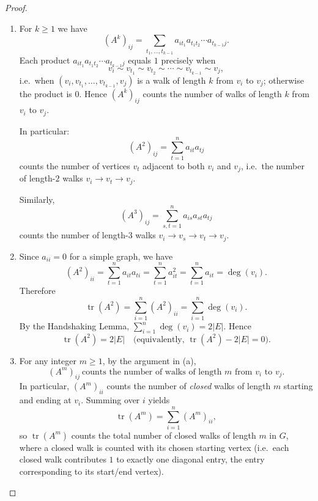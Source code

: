\documentclass[11pt, a4paper]{ctexrep}
\begin{document}
\begin{proof}
    \begin{enumerate}
        \item[(a)] For $k\ge 1$ we have
              \[
                  (A^k)_{ij}=\sum_{t_1,\dots,t_{k-1}} a_{i t_1}a_{t_1 t_2}\cdots a_{t_{k-1}j}.
              \]
              Each product $a_{i t_1}a_{t_1 t_2}\cdots a_{t_{k-1}j}$ equals $1$ precisely when
              \[
                  v_i\sim v_{t_1}\sim v_{t_2}\sim \cdots \sim v_{t_{k-1}}\sim v_j,
              \]
              i.e.\ when $(v_i,v_{t_1},\dots,v_{t_{k-1}},v_j)$ is a walk of length $k$ from $v_i$ to $v_j$; otherwise the product is $0$.
              Hence $(A^k)_{ij}$ counts the number of walks of length $k$ from $v_i$ to $v_j$.

              In particular:
              \[
                  (A^2)_{ij}=\sum_{t=1}^n a_{it}a_{tj}
              \]
              counts the number of vertices $v_t$ adjacent to both $v_i$ and $v_j$, i.e.\ the number of length-$2$ walks $v_i\to v_t\to v_j$.

              Similarly,
              \[
                  (A^3)_{ij}=\sum_{s,t=1}^n a_{is}a_{st}a_{tj}
              \]
              counts the number of length-$3$ walks $v_i\to v_s\to v_t\to v_j$.

        \item[(b)] Since $a_{ii}=0$ for a simple graph, we have
              \[
                  (A^2)_{ii}=\sum_{t=1}^n a_{it}a_{ti}=\sum_{t=1}^n a_{it}^2=\sum_{t=1}^n a_{it}=\deg(v_i).
              \]
              Therefore
              \[
                  \operatorname{tr}(A^2)=\sum_{i=1}^n (A^2)_{ii}=\sum_{i=1}^n \deg(v_i).
              \]
              By the Handshaking Lemma, $\sum_{i=1}^n \deg(v_i)=2|E|$. Hence
              \[
                  \operatorname{tr}(A^2)=2|E|
                  \quad\text{(equivalently, }\operatorname{tr}(A^2)-2|E|=0\text{).}
              \]

        \item[(c)] For any integer $m\ge 1$, by the argument in (a),
              \[
                  (A^m)_{ij}\ \text{counts the number of walks of length $m$ from $v_i$ to $v_j$}.
              \]
              In particular, $(A^m)_{ii}$ counts the number of \emph{closed} walks of length $m$ starting and ending at $v_i$.
              Summing over $i$ yields
              \[
                  \operatorname{tr}(A^m)=\sum_{i=1}^n (A^m)_{ii},
              \]
              so $\operatorname{tr}(A^m)$ counts the total number of closed walks of length $m$ in $G$, where a closed walk is counted with its chosen starting vertex (i.e.\ each closed walk contributes $1$ to exactly one diagonal entry, the entry corresponding to its start/end vertex).
    \end{enumerate}
\end{proof}
\end{document}

